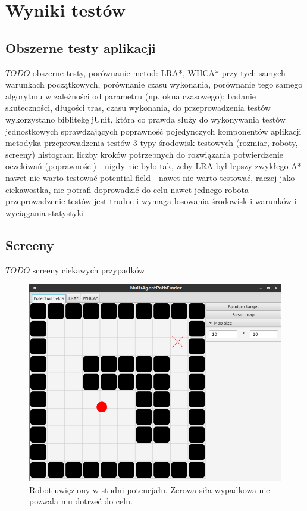 \chapter{Wyniki testów}
\label{ch:tests}

\section{Obszerne testy aplikacji}
$TODO$ obszerne testy, porównanie metod: LRA*, WHCA* przy tych samych warunkach początkowych, porównanie czasu wykonania, porównanie tego samego algorytmu w zależności od parametru (np. okna czasowego); badanie skuteczności, długości tras, czasu wykonania, 
do przeprowadzenia testów wykorzystano biblitekę jUnit, która co prawda służy do wykonywania testów jednostkowych sprawdzających poprawność pojedynczych komponentów aplikacji
metodyka przeprowadzenia testów
3 typy środowisk testowych (rozmiar, roboty, screeny)
histogram liczby kroków potrzebnych do rozwiązania
potwierdzenie oczekiwań (poprawności) - nigdy nie było tak, żeby LRA był lepszy
zwykłego A* nawet nie warto testować
potential field - nawet nie warto testować, raczej jako ciekawostka, nie potrafi doprowadzić do celu nawet jednego robota
przeprowadzenie testów jest trudne i wymaga losowania środowisk i warunków i wyciągania statystyki

\section{Screeny}
$TODO$ screeny ciekawych przypadków

\begin{figure}
	\centering
	\includegraphics[width=0.8\columnwidth]{img/robopath/field-potential-hole}
	\caption{Robot uwięziony w studni potencjału. Zerowa siła wypadkowa nie pozwala mu dotrzeć do celu.}
	\label{fig:app-tech-intellij}
\end{figure}

